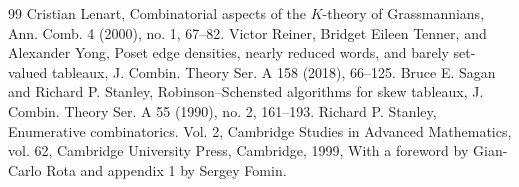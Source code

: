 \begin{thebibliography}{99}
 Cristian Lenart, Combinatorial aspects of the $K$-theory of Grassmannians, Ann. Comb. 4 (2000), no. 1, 67--82.
 Victor Reiner, Bridget Eileen Tenner, and Alexander Yong, Poset edge densities, nearly reduced words, and barely set-valued tableaux, J. Combin. Theory Ser. A 158 (2018), 66--125.
 Bruce E. Sagan and Richard P. Stanley, Robinson--Schensted algorithms for skew tableaux, J. Combin. Theory Ser. A 55 (1990), no. 2, 161--193.
 Richard P. Stanley, Enumerative combinatorics. Vol. 2, Cambridge Studies in Advanced Mathematics, vol. 62, Cambridge University Press, Cambridge, 1999, With a foreword by Gian-Carlo Rota and appendix 1 by Sergey Fomin.
\end{thebibliography}
